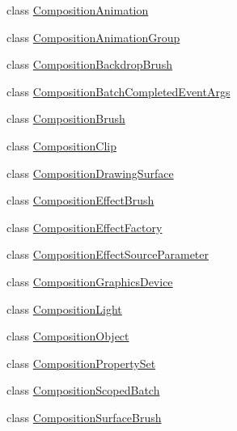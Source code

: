 \begin{DoxyCompactItemize}
\item 
class \hyperlink{class_windows_1_1_u_i_1_1_composition_1_1_composition_animation}{Composition\+Animation}
\item 
class \hyperlink{class_windows_1_1_u_i_1_1_composition_1_1_composition_animation_group}{Composition\+Animation\+Group}
\item 
class \hyperlink{class_windows_1_1_u_i_1_1_composition_1_1_composition_backdrop_brush}{Composition\+Backdrop\+Brush}
\item 
class \hyperlink{class_windows_1_1_u_i_1_1_composition_1_1_composition_batch_completed_event_args}{Composition\+Batch\+Completed\+Event\+Args}
\item 
class \hyperlink{class_windows_1_1_u_i_1_1_composition_1_1_composition_brush}{Composition\+Brush}
\item 
class \hyperlink{class_windows_1_1_u_i_1_1_composition_1_1_composition_clip}{Composition\+Clip}
\item 
class \hyperlink{class_windows_1_1_u_i_1_1_composition_1_1_composition_drawing_surface}{Composition\+Drawing\+Surface}
\item 
class \hyperlink{class_windows_1_1_u_i_1_1_composition_1_1_composition_effect_brush}{Composition\+Effect\+Brush}
\item 
class \hyperlink{class_windows_1_1_u_i_1_1_composition_1_1_composition_effect_factory}{Composition\+Effect\+Factory}
\item 
class \hyperlink{class_windows_1_1_u_i_1_1_composition_1_1_composition_effect_source_parameter}{Composition\+Effect\+Source\+Parameter}
\item 
class \hyperlink{class_windows_1_1_u_i_1_1_composition_1_1_composition_graphics_device}{Composition\+Graphics\+Device}
\item 
class \hyperlink{class_windows_1_1_u_i_1_1_composition_1_1_composition_light}{Composition\+Light}
\item 
class \hyperlink{class_windows_1_1_u_i_1_1_composition_1_1_composition_object}{Composition\+Object}
\item 
class \hyperlink{class_windows_1_1_u_i_1_1_composition_1_1_composition_property_set}{Composition\+Property\+Set}
\item 
class \hyperlink{class_windows_1_1_u_i_1_1_composition_1_1_composition_scoped_batch}{Composition\+Scoped\+Batch}
\item 
class \hyperlink{class_windows_1_1_u_i_1_1_composition_1_1_composition_surface_brush}{Composition\+Surface\+Brush}

\end{DoxyCompactItemize}
